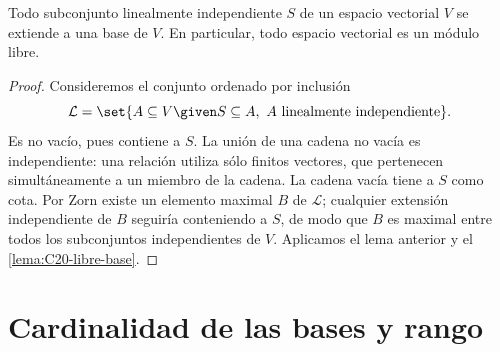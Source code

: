 \begin{prop}\label{prop:C20-extension-base}
Todo subconjunto linealmente independiente $S$ de un espacio vectorial $V$ se extiende a una base de $V$. En particular, todo espacio vectorial es un módulo libre.
\end{prop}
\begin{proof}
Consideremos el conjunto ordenado por inclusión
\[
\mathcal L=\set{A\subseteq V\given S\subseteq A,\ A\text{ linealmente independiente}}.
\]
Es no vacío, pues contiene a $S$. La unión de una cadena no vacía es independiente: una relación utiliza sólo finitos vectores, que pertenecen simultáneamente a un miembro de la cadena. La cadena vacía tiene a $S$ como cota. Por Zorn existe un elemento maximal $B$ de $\mathcal L$; cualquier extensión independiente de $B$ seguiría conteniendo a $S$, de modo que $B$ es maximal entre todos los subconjuntos independientes de $V$. Aplicamos el lema anterior y el \cref{lema:C20-libre-base}.
\end{proof}

\section{Cardinalidad de las bases y rango}
